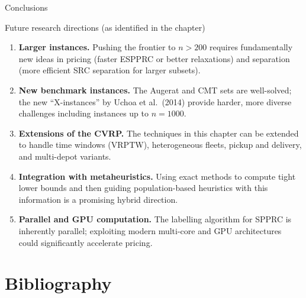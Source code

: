 \documentclass[aspectratio=169,10pt]{beamer}
\begin{document}
\begin{frame}[allowframebreaks]{Conclusions}
\begin{block}{Future research directions (as identified in the chapter)}
\begin{enumerate}
  \item \textbf{Larger instances.} Pushing the frontier to $n > 200$
        requires fundamentally new ideas in pricing (faster ESPPRC or
        better relaxations) and separation (more efficient SRC
        separation for larger subsets).
  \item \textbf{New benchmark instances.} The Augerat and CMT sets are
        well-solved; the new ``X-instances'' by Uchoa et al.\ (2014)
        provide harder, more diverse challenges including instances up
        to $n = 1000$.
  \item \textbf{Extensions of the CVRP.} The techniques in this chapter
        can be extended to handle time windows (VRPTW), heterogeneous
        fleets, pickup and delivery, and multi-depot variants.
  \item \textbf{Integration with metaheuristics.} Using exact methods
        to compute tight lower bounds and then guiding population-based
        heuristics with this information is a promising hybrid direction.
  \item \textbf{Parallel and GPU computation.} The labelling algorithm
        for SPPRC is inherently parallel; exploiting modern multi-core
        and GPU architectures could significantly accelerate pricing.
\end{enumerate}
\end{block}

\end{frame}

\section{Bibliography}
\end{document}
